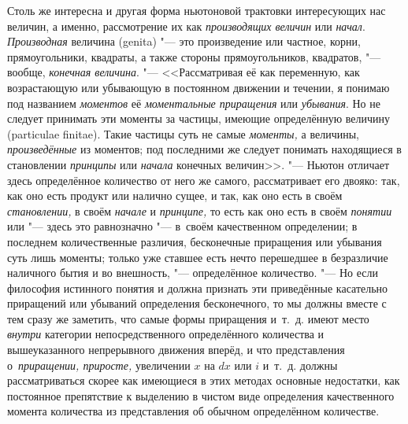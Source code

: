 Столь же интересна и другая форма ньютоновой трактовки интересующих нас
величин, а именно, рассмотрение их как {\em производящих величин} или
{\em начал}. {\em Производная} величина (genita) "--- это произведение или
частное, корни, прямоугольники, квадраты, а также стороны прямоугольников,
квадратов, "--- вообще, {\em конечная величина}. "--- <<Рассматривая её как
переменную, как возрастающую или убывающую в постоянном движении и течении,
я понимаю под названием {\em моментов} её {\em моментальные приращения} или
{\em убывания}. Но не следует принимать эти моменты за частицы, имеющие
определённую величину (particulae finitae). Такие частицы суть не самые
{\em моменты,} а величины, {\em произведённые} из моментов; под последними же
следует понимать находящиеся в становлении {\em принципы} или {\em начала}
конечных величин>>. "--- Ньютон отличает здесь определённое количество от него
же самого, рассматривает его двояко: так, как оно есть продукт или налично
сущее, и так, как оно есть в своём {\em становлении,} в своём {\em начале} и
{\em принципе,} то есть как оно есть в своём {\em понятии} или "--- здесь это
равнозначно "--- в~своём качественном определении; в последнем количественные
различия, бесконечные приращения или убывания суть лишь моменты; только уже
ставшее есть нечто перешедшее в безразличие наличного бытия и во внешность,
"--- определённое количество. "--- Но если философия истинного понятия и должна
признать эти приведённые касательно приращений или убываний определения
бесконечного, то мы должны вместе с тем сразу же заметить, что самые формы
приращения и~т.~д. имеют место {\em внутри} категории непосредственного
определённого количества и вышеуказанного непрерывного движения вперёд, и что
представления о~{\em приращении, приросте,} увеличении $x$ на
$dx$ или $i$ и~т.~д. должны рассматриваться скорее как имеющиеся в этих
методах основные недостатки, как постоянное препятствие к выделению в чистом
виде определения качественного момента количества из представления об обычном
определённом количестве.


